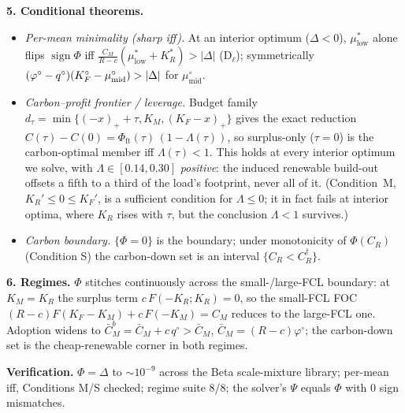 \documentclass[11pt]{article}
\newcommand{\KR}{K_R}\newcommand{\KF}{K_F}\newcommand{\KM}{K_M}
\newcommand{\KRs}{K_R^{*}}\newcommand{\KFs}{K_F^{*}}\newcommand{\KMs}{K_M^{*}}
\newcommand{\CM}{C_M}\newcommand{\CF}{C_F}\newcommand{\CR}{C_R}\newcommand{\Dbar}{\bar D}
\newcommand{\phio}{\varphi^{\circ}}\newcommand{\qo}{q^{\circ}}\newcommand{\CMbar}{\bar C_M}
\newcommand{\mulow}{\mu^{*}_{\mathrm{low}}}\newcommand{\mumid}{\mu^{\circ}_{\mathrm{mid}}}
\begin{document}
\textbf{5. Conditional theorems.}
\begin{itemize}
\item \emph{Per-mean minimality (sharp iff).} At an interior optimum ($\Delta<0$),
  $\mulow$ alone flips $\operatorname{sign}\Phi$ iff $\tfrac{\CM}{R-c}(\mulow+\KRs)>|\Delta|$
  ($\mathrm{D}_\ell$); symmetrically $(\phio-\qo)(\KFo-\mumid)>|\Delta|$ for $\mumid$.
\item \emph{Carbon--profit frontier / leverage.} Budget family
  $d_\tau=\min\{(-x)_++\tau,\KM,(\KF-x)_+\}$ gives the exact reduction
  $C(\tau)-C(0)=\Phi_{\mathrm{ft}}(\tau)\,(1-\Lambda(\tau))$, so surplus-only ($\tau=0$)
  is the carbon-optimal member iff $\Lambda(\tau)<1$. This holds at every interior optimum
  we solve, with $\Lambda\in[0.14,0.30]$ \emph{positive}: the induced renewable build-out
  offsets a fifth to a third of the load's footprint, never all of it. (Condition~M,
  $\KR'\le0\le\KF'$, is a sufficient condition for $\Lambda\le0$; it in fact fails at
  interior optima, where $\KR$ rises with $\tau$, but the conclusion $\Lambda<1$ survives.)
\item \emph{Carbon boundary.} $\{\Phi=0\}$ is the boundary; under monotonicity of
  $\Phi(\CR)$ (Condition S) the carbon-down set is an interval $\{\CR<\CR^{\dagger}\}$.
\end{itemize}

\textbf{6. Regimes.} $\Phi$ stitches continuously across the small-/large-FCL boundary:
at $\KM=\KR$ the surplus term $c\,F(-\KR;\KR)=0$, so the small-FCL FOC
$(R-c)F(\KF-\KM)+c\,F(-\KM)=\CM$ reduces to the large-FCL one. Adoption widens to
$\CMbar^{b}=\CMbar+c\,\qo>\CMbar$, $\CMbar=(R-c)\phio$; the carbon-down set is the
cheap-renewable corner in both regimes.

\textbf{Verification.} $\Phi=\Delta$ to $\sim10^{-9}$ across the Beta scale-mixture library;
per-mean iff, Conditions M/S checked; regime suite 8/8; the solver's $\Psi$ equals $\Phi$
with $0$ sign mismatches.
\end{document}
